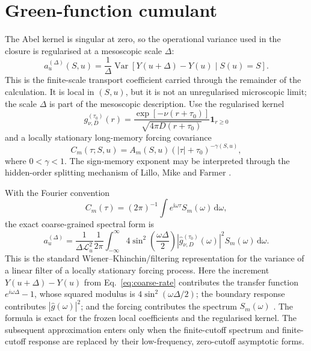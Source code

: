 \documentclass[11pt]{amsart}
\newcommand{\Var}{\operatorname{Var}}
\newcommand{\dd}{\,\mathrm{d}}
\newcommand{\ii}{\mathrm{i}}
\newcommand{\wh}[1]{\widehat{#1}}
\newcommand{\cL}{\mathcal{L}}
\theoremstyle{definition}
\theoremstyle{plain}
\theoremstyle{remark}
\begin{document}
\section{Green-function cumulant}
The Abel kernel is singular at zero, so the operational variance used in the closure is regularised at a mesoscopic scale $\Delta$:
\begin{equation}
 a_u^{(\Delta)}(S,u)=\frac{1}{\Delta}
 \Var\left[Y(u+\Delta)-Y(u)\mid S(u)=S\right].
 \label{eq:coarse-rate}
\end{equation}
This is the finite-scale transport coefficient carried through the remainder of the calculation. It is local in $(S,u)$, but it is not an unregularised microscopic limit; the scale $\Delta$ is part of the mesoscopic description.
Use the regularised kernel
\begin{equation}
 g_{\nu,D}^{(\tau_0)}(r)=
 \frac{\exp[-\nu(r+\tau_0)]}{\sqrt{4\pi D(r+\tau_0)}}\mathbf{1}_{r\ge0}
 \label{eq:regularized-kernel}
\end{equation}
and a locally stationary long-memory forcing covariance
\begin{equation}
 C_m(\tau;S,u)=A_m(S,u)(|\tau|+\tau_0)^{-\gamma(S,u)},
 \label{eq:forcing-cov}
\end{equation}
where $ 0<\gamma<1$.
The sign-memory exponent may be interpreted through the hidden-order splitting mechanism of Lillo, Mike and Farmer \cite{LilloMikeFarmer2005}. 

With the Fourier convention 
\begin{equation}
    C_m(\tau)=(2\pi)^{-1}\int e^{\ii\omega\tau}S_m(\omega)\dd\omega,
\end{equation}
the exact coarse-grained spectral form is
\begin{equation}
 a_u^{(\Delta)}=\frac{1}{\Delta\cL_u^2}\frac{1}{2\pi}
 \int_{-\infty}^{\infty}4\sin^2\left(\frac{\omega\Delta}{2}\right)
 \left|\wh g_{\nu,D}^{(\tau_0)}(\omega)\right|^2S_m(\omega)\dd\omega.
 \label{eq:spectral-cumulant}
\end{equation}
This is the standard Wiener--Khinchin/filtering representation for the variance of a linear filter of a locally stationary forcing process. Here the increment
\(Y(u+\Delta)-Y(u)\) from Eq.~\eqref{eq:coarse-rate} contributes the transfer function \(e^{i\omega\Delta}-1\), whose squared modulus is \(4\sin^2(\omega\Delta/2)\); the boundary response contributes \(|\widehat g(\omega)|^2\); and the forcing contributes the spectrum \(S_m(\omega)\) \cite{Priestley1981}. The formula is exact for the frozen local coefficients and the regularised kernel. The subsequent approximation enters only when the finite-cutoff spectrum and finite-cutoff response are replaced by their low-frequency, zero-cutoff asymptotic forms.
\end{document}
